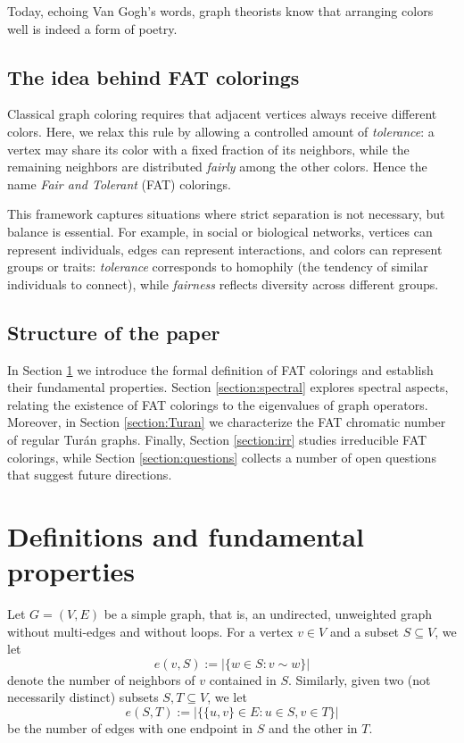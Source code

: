 \documentclass{article}
\theoremstyle{plain}
\theoremstyle{definition}
\theoremstyle{remark}
\begin{document}
Today, echoing Van Gogh's words, graph theorists know that arranging colors well is indeed a form of poetry. 

\subsection*{The idea behind FAT colorings}

Classical graph coloring requires that adjacent vertices always receive different colors. Here, we relax this rule by allowing a controlled amount of \emph{tolerance}: a vertex may share its color with a fixed fraction of its neighbors, while the remaining neighbors are distributed \emph{fairly} among the other colors. Hence the name \emph{Fair and Tolerant} (FAT) colorings. \newline

This framework captures situations where strict separation is not necessary, but balance is essential. For example, in social or biological networks, vertices can represent individuals, edges can represent interactions, and colors can represent groups or traits: \emph{tolerance} corresponds to homophily (the tendency of similar individuals to connect), while \emph{fairness} reflects diversity across different groups.


\subsection*{Structure of the paper}

In Section \ref{section:definitions} we introduce the formal definition of FAT colorings and establish their fundamental properties.  Section \ref{section:spectral} explores spectral aspects, relating the existence of FAT colorings to the eigenvalues of graph operators.  Moreover, in Section \ref{section:Turan} we characterize the FAT chromatic number of regular Turán graphs. Finally, Section \ref{section:irr} studies irreducible FAT colorings, while Section \ref{section:questions} collects a number of open questions that suggest future directions.


\section{Definitions and fundamental properties}\label{section:definitions}

Let $G=(V,E)$ be a simple graph, that is, an undirected, unweighted graph without multi-edges and without loops. For a vertex $v\in V$ and a subset $S\subseteq V$, we let
$$
e(v,S) := |\{w\in S : v\sim w\}|
$$
denote the number of neighbors of $v$ contained in $S$. Similarly, given two (not necessarily distinct) subsets $S,T\subseteq V$, we let
$$
e(S,T) := |\{\{u,v\}\in E : u\in S, v\in T\}|
$$
be the number of edges with one endpoint in $S$ and the other in $T$.\newline 
\end{document}
